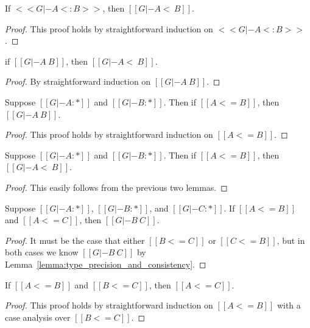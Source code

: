\begin{lemma}
  \label{lemma:consistent-subtyping-2}
  If $<<G |- A <: B>>$, then $[[G |- A <~ B]]$.
\end{lemma}
\begin{proof}
  This proof holds by straightforward induction on $<<G |- A <: B>>$.
\end{proof}

\begin{lemma}
  \label{lemma:consistent-subtyping-3}
  if $[[G |- A ~ B]]$, then $[[G |- A <~ B]]$.
\end{lemma}
\begin{proof}
  By straightforward induction on $[[G |- A ~ B]]$.
\end{proof}

\begin{lemma}
  \label{lemma:type_precision_and_consistency}
  Suppose $[[G |- A : *]]$ and $[[G |- B : *]]$.  Then
  if $[[A <= B]]$, then $[[G |- A ~ B]]$.
\end{lemma}
\begin{proof}
  This proof holds by straightforward induction on $[[A <= B]]$.
\end{proof}

\begin{corollary}
  \label{corollary:type_precision_and_subtyping}
  Suppose $[[G |- A : *]]$ and $[[G |- B : *]]$.  Then
  if $[[A <= B]]$, then $[[G |- A <~ B]]$.
\end{corollary}
\begin{proof}
  This easily follows from the previous two lemmas.
\end{proof}

\begin{lemma}
  \label{lemma:type_precision_triangle_consistenty}
  Suppose $[[G |- A : *]]$, $[[G |- B : *]]$, and $[[G |- C : *]]$.
  If $[[A <= B]]$ and $[[A <= C]]$, then $[[G |- B ~ C]]$.
\end{lemma}
\begin{proof}
  It must be the case that either $[[B <= C]]$ or $[[C <= B]]$, but in both cases
  we know $[[G |- B ~ C]]$ by Lemma~\ref{lemma:type_precision_and_consistency}.
\end{proof}

\begin{lemma}
  \label{lemma:transitivity_for_type_precision}
  If $[[A <= B]]$ and $[[B <= C]]$, then $[[A <= C]]$.
\end{lemma}
\begin{proof}
  This proof holds by straightforward induction on $[[A <= B]]$ with
  a case analysis over $[[B <= C]]$.
\end{proof}

